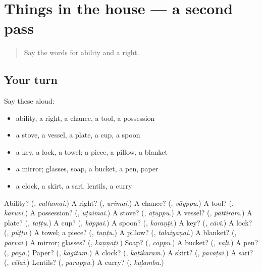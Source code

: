 \section[(dialogue)]{Things in the house — a second pass}

\label{lesson:TA-R121-second-pass-things-in-the-house}



\begin{quote}
Say the words for ability and a right.
\end{quote}

\subsection*{Your turn}
Say these aloud:

\begin{itemize}
\raggedright
  \item ability, a right, a chance, a tool, a possession
  \item a stove, a vessel, a plate, a cup, a spoon
  \item a key, a lock, a towel; a piece, a pillow, a blanket
  \item a mirror; glasses, soap, a bucket, a pen, paper
  \item a clock, a skirt, a sari, lentils, a curry
\end{itemize}

\begin{tcolorbox}[breakable,colback=teal!4,colframe=teal!35!black,title={Before you move on}]
Ability? (\textbf{}, \emph{vallamai}.) A right? (\textbf{}, \emph{urimai}.) A chance? (\textbf{}, \emph{vāyppu}.) A tool? (\textbf{}, \emph{karuvi}.) A possession? (\textbf{}, \emph{uṭaimai}.) A stove? (\textbf{}, \emph{aṭuppu}.) A vessel? (\textbf{}, \emph{pāttiram}.) A plate? (\textbf{}, \emph{taṭṭu}.) A cup? (\textbf{}, \emph{kōppai}.) A spoon? (\textbf{}, \emph{karaṇṭi}.) A key? (\textbf{}, \emph{cāvi}.) A lock? (\textbf{}, \emph{pūṭṭu}.) A towel; a piece? (\textbf{}, \emph{tuṇṭu}.) A pillow? (\textbf{}, \emph{talaiyaṇai}.) A blanket? (\textbf{}, \emph{pōrvai}.) A mirror; glasses? (\textbf{}, \emph{kaṇṇāṭi}.) Soap? (\textbf{}, \emph{cōppu}.) A bucket? (\textbf{}, \emph{vāḷi}.) A pen? (\textbf{}, \emph{pēṉā}.) Paper? (\textbf{}, \emph{kāgitam}.) A clock? (\textbf{}, \emph{kaṭikāram}.) A skirt? (\textbf{}, \emph{pāvāṭai}.) A sari? (\textbf{}, \emph{cēlai}.) Lentils? (\textbf{}, \emph{paruppu}.) A curry? (\textbf{}, \emph{kuḻambu}.)
\end{tcolorbox}
